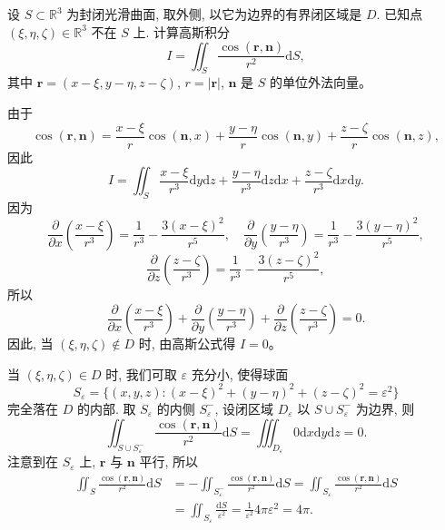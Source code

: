\documentclass[12pt,fontset=fandol]{ctexart}
\begin{document}
\begin{example}\label{course-example-16-5-4}\quad 设 $S\subset\mathbb R^3$ 为封闭光滑曲面, 取外侧, 以它为边界的有界闭区域是 $D$. 已知点 $(\xi,\eta,\zeta)\in\mathbb R^3$ 不在 $S$ 上. 计算高斯积分
\[
  I=\iint_S\frac{\cos(\boldsymbol r,\boldsymbol n)}{r^2}\mathrm dS,
\]
其中 $\boldsymbol r=(x-\xi,y-\eta,z-\zeta)$, $r=|\boldsymbol r|$, $\boldsymbol n$ 是 $S$ 的单位外法向量。

\end{example}
\begin{solve}\quad 由于
\[
  \cos(\boldsymbol r,\boldsymbol n)
  =\frac{x-\xi}{r}\cos(\boldsymbol n,x)
   +\frac{y-\eta}{r}\cos(\boldsymbol n,y)
   +\frac{z-\zeta}{r}\cos(\boldsymbol n,z),
\]
因此
\[
  I=\iint_S\frac{x-\xi}{r^3}\mathrm dy\mathrm dz
    +\frac{y-\eta}{r^3}\mathrm dz\mathrm dx
    +\frac{z-\zeta}{r^3}\mathrm dx\mathrm dy.
\]
因为
\[
  \frac{\partial}{\partial x}\left(\frac{x-\xi}{r^3}\right)=\frac1{r^3}-\frac{3(x-\xi)^2}{r^5},\quad
  \frac{\partial}{\partial y}\left(\frac{y-\eta}{r^3}\right)=\frac1{r^3}-\frac{3(y-\eta)^2}{r^5},
\]
\[
  \frac{\partial}{\partial z}\left(\frac{z-\zeta}{r^3}\right)=\frac1{r^3}-\frac{3(z-\zeta)^2}{r^5},
\]
所以
\[
  \frac{\partial}{\partial x}\left(\frac{x-\xi}{r^3}\right)
  +\frac{\partial}{\partial y}\left(\frac{y-\eta}{r^3}\right)
  +\frac{\partial}{\partial z}\left(\frac{z-\zeta}{r^3}\right)=0.
\]
因此, 当 $(\xi,\eta,\zeta)\notin D$ 时, 由高斯公式得 $I=0$。

当 $(\xi,\eta,\zeta)\in D$ 时, 我们可取 $\varepsilon$ 充分小, 使得球面
\[
  S_\varepsilon=\{(x,y,z):(x-\xi)^2+(y-\eta)^2+(z-\zeta)^2=\varepsilon^2\}
\]
完全落在 $D$ 的内部. 取 $S_\varepsilon$ 的内侧 $S_\varepsilon^-$, 设闭区域 $D_\varepsilon$ 以 $S\cup S_\varepsilon^-$ 为边界, 则
\[
  \iint_{S\cup S_\varepsilon^-}\frac{\cos(\boldsymbol r,\boldsymbol n)}{r^2}\mathrm dS
  =\iiint_{D_\varepsilon}0\mathrm dx\mathrm dy\mathrm dz=0.
\]
注意到在 $S_\varepsilon$ 上, $\boldsymbol r$ 与 $\boldsymbol n$ 平行, 所以
\[
\begin{aligned}
  \iint_S\frac{\cos(\boldsymbol r,\boldsymbol n)}{r^2}\mathrm dS
  &=-\iint_{S_\varepsilon^-}\frac{\cos(\boldsymbol r,\boldsymbol n)}{r^2}\mathrm dS
    =\iint_{S_\varepsilon}\frac{\cos(\boldsymbol r,\boldsymbol n)}{r^2}\mathrm dS\\
  &=\iint_{S_\varepsilon}\frac{\mathrm dS}{\varepsilon^2}
    =\frac1{\varepsilon^2}4\pi\varepsilon^2=4\pi.
\end{aligned}
\]

\end{solve}
\end{document}
